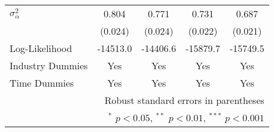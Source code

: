 \begin{center}
\begin{tabular}{l*{4}{c}}
$\sigma^{2}_{\alpha}$     &       0.804         &       0.771
            &       0.731         &       0.687         \\
                & (0.024) & (0.024)&(0.022) & (0.021)\\
Log-Likelihood          &    -14513.0         &    -14406.6         &    -15879.7         &    -15749.5         \\
\hline
\hline
Industry Dummies & Yes& Yes& Yes& Yes\\
Time Dummies& Yes& Yes& Yes& Yes\\
\hline\hline
\multicolumn{5}{r}{\footnotesize Robust standard errors  in parentheses}\\
\multicolumn{5}{r}{\footnotesize $^{*}$ \(p<0.05\), $^{**}$ \(p<0.01\), $^{***}$ \(p<0.001\)}\\
\end{tabular}
\end{center}
